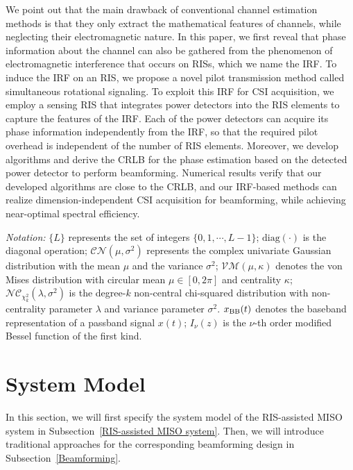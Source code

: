 \documentclass[conference,10pt,twocolumn]{IEEEtran}
\theoremstyle{nonumberplain}
\def \VM {\mathcal{VM}}
\def \nc {\mathcal{NC}}
\begin{document}
We point out that the main drawback of conventional channel estimation methods is that they only extract the mathematical features of channels, while neglecting their electromagnetic nature. 
In this paper, we first reveal that phase information about the channel can also be gathered from the phenomenon of electromagnetic interference that occurs on RISs, which we name the \ac{IRF}. To induce the \ac{IRF} on an RIS, we propose a novel pilot transmission method called simultaneous rotational signaling.
To exploit this \ac{IRF} for CSI acquisition, we employ a sensing RIS that integrates power detectors into the RIS elements to capture the features of the \ac{IRF}. Each of the power detectors can acquire its phase information independently from the \ac{IRF}, so that the required pilot overhead is independent of the number of RIS elements. 
Moreover, we develop algorithms and derive the \ac{CRLB} for the phase estimation based on the detected power detector to perform beamforming.
Numerical results verify that our developed algorithms are close to the \ac{CRLB}, and our \ac{IRF}-based methods can realize dimension-independent CSI acquisition for beamforming, while achieving near-optimal spectral efficiency. 

\textit{Notation:}
$\{L\}$ represents the set of integers $\{0,1,\cdots,L-1\}$; 
$\text{diag}(\cdot )$ is the diagonal operation;
$\mathcal{CN}\left(\mu, \sigma^2 \right)$ represents the complex univariate Gaussian distribution with the mean $\mu$ and the variance $\sigma^2$;
$\VM(\mu, \kappa)$ denotes the von Mises distribution with circular mean $\mu\in [0,2\pi]$ and centrality $\kappa$;
$\nc_{\chi_k^2}(\lambda, \sigma^2)$ is the degree-$k$ non-central chi-squared distribution with non-centrality parameter $\lambda$ and variance parameter $\sigma^2$. 
$x_{\rm BB}(t)$ denotes the baseband representation of a passband signal $x(t)$;
$I_\nu(z)$ is the $\nu$-th order modified Bessel function of the first kind. 


\section{System Model}  \label{System Model}
    In this section, we will first specify the system model of the RIS-assisted \ac{MISO} system in Subsection~\ref{RIS-assisted MISO system}. 
    Then, we will introduce traditional approaches for the corresponding beamforming design in Subsection~\ref{Beamforming}.
\end{document}

